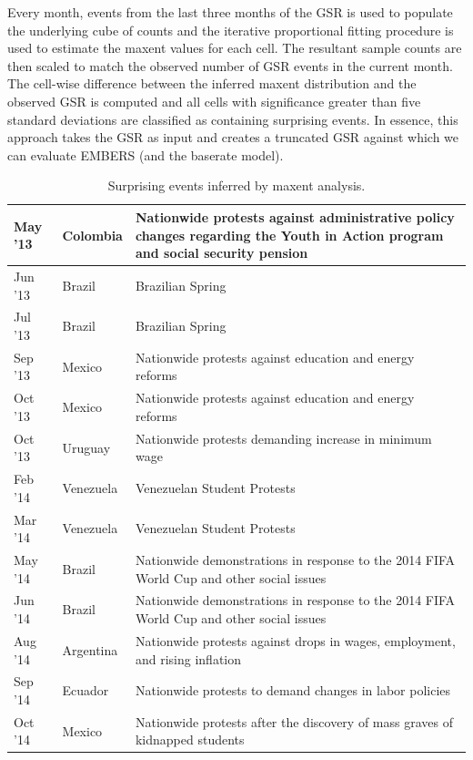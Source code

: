 Every month, events from the last three months of the
GSR is used to populate the underlying cube of counts and the iterative proportional fitting procedure is
used to estimate the maxent values for each cell. The resultant sample counts are then scaled to
match the observed number of GSR events in the current month. The cell-wise difference between the inferred
maxent distribution and the observed GSR is computed and all cells with significance greater than five standard
deviations are classified as containing surprising events. In essence, this approach takes the GSR as input and
creates a truncated GSR against which we can evaluate EMBERS (and the baserate model).

\begin{table}
\caption{Surprising events inferred by maxent analysis.}
\renewcommand{\arraystretch}{1.1}
\vspace{-3mm}
 \centering
 \begin{tabular}{|l|l|m{5cm}|}
 \hline
May '13  &  Colombia	 &  Nationwide protests against administrative policy changes regarding the
Youth in Action program and social security pension \\ \hline
Jun '13  &  Brazil  &  Brazilian Spring \\ \hline
Jul '13  &  Brazil  &  Brazilian Spring \\ \hline
Sep '13  &  Mexico  &  Nationwide protests against education and energy reforms \\ \hline
Oct '13  &  Mexico  &  Nationwide protests against education and energy reforms \\ \hline
Oct '13  &  Uruguay  &  Nationwide protests demanding increase in minimum wage \\ \hline
Feb '14  &  Venezuela	  &  Venezuelan Student Protests \\ \hline
Mar '14  &  Venezuela  &  	Venezuelan Student Protests \\ \hline
May '14  &  Brazil  &  Nationwide demonstrations in response to the 2014 FIFA World Cup and other social issues \\ \hline
Jun '14  &  Brazil  &  Nationwide demonstrations in response to the 2014 FIFA World Cup and other social issues \\ \hline
Aug '14  &  Argentina	  &  Nationwide protests against drops in wages, employment, and rising inflation \\ \hline
Sep '14  &  Ecuador  &  Nationwide protests to demand changes in labor policies \\ \hline
Oct '14  &  Mexico  &  Nationwide protests after the discovery of mass graves of kidnapped students  \\ \hline
\end{tabular}
\label{tab:maxentEvents}
\end{table}

